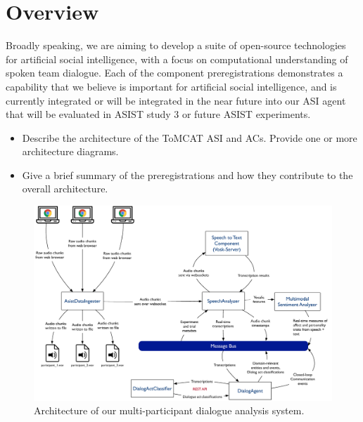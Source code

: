 \section{Overview}

Broadly speaking, we are aiming to develop a suite of open-source technologies
for artificial social intelligence, with a focus on computational understanding
of spoken team dialogue. Each of the component preregistrations demonstrates a
capability that we believe is important for artificial social intelligence, and
is currently integrated or will be integrated in the near future into our ASI
agent that will be evaluated in ASIST study 3 or future ASIST experiments.

\begin{itemize}
    \item Describe the architecture of the ToMCAT ASI and ACs. Provide one or
        more architecture diagrams.
    \item Give a brief summary of the preregistrations and how they contribute
        to the overall architecture.
\end{itemize}

\begin{figure}
    \centering
    \includegraphics[width=6.5in]{images/nlp_architecture}
    \caption{Architecture of our multi-participant dialogue analysis system.}
\end{figure}

